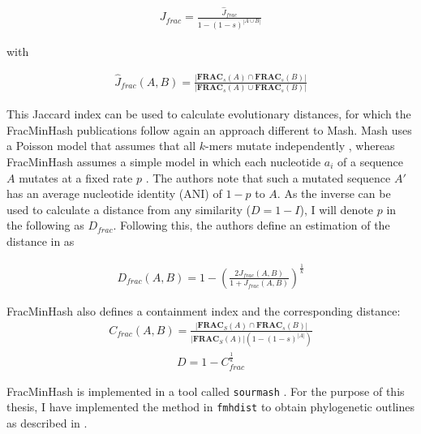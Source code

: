 \begin{align}
  J_{frac} = \frac{\hat{J}_{frac}}{1 - (1 - s)^{|A \cup B|}}
\end{align}

with

\begin{align}
  \hat{J}_{frac}(A, B) = \frac{|\mathbf{FRAC}_s(A) \cap \mathbf{FRAC}_s(B)|}{|\mathbf{FRAC}_s(A) \cup \mathbf{FRAC}_s(B)|}  
\end{align}

This Jaccard index can be used to calculate evolutionary distances, for which
the FracMinHash publications follow again an approach different to Mash. Mash
uses a Poisson model that assumes that all $k$-mers mutate independently
\cite{ondovMashFastGenome2016,heraDerivingConfidenceIntervals2023,fanAssemblyAlignmentfreeMethod2015},
whereas FracMinHash assumes a simple model in which each nucleotide $a_i$ of a
sequence $A$ mutates at a fixed rate $p$
\cite{heraDerivingConfidenceIntervals2023}. The authors note that such a
mutated sequence $A'$ has an average nucleotide identity (ANI) of $1-p$ to $A$.
As the inverse can be used to calculate a distance from any similarity ($D = 1 -
I$), I will denote $p$ in the following as $D_{frac}$. Following this, the
authors define an estimation of the distance in
\cite{heraDerivingConfidenceIntervals2023} as

\begin{align}
  D_{frac}(A, B) = 1 - (\frac{2J_{frac}(A,B)}{1+J_{frac}(A, B)})^{\frac{1}{k}}
\end{align}

FracMinHash also defines a containment index and the corresponding distance:
\begin{align}
  C_{frac}(A, B) = \frac{|\mathbf{FRAC}_S(A) \cap \mathbf{FRAC}_s(B)|}{|\mathbf{FRAC}_S(A)| (1-(1-s)^{|A|})}
\end{align}
\begin{align}
  D=1-C_{frac}^{\frac{1}{k}}
\end{align}

FracMinHash is implemented in a tool called \texttt{sourmash}
\cite{irberLightweightCompositionalAnalysis2022,irberDecentralizingIndicesGenomic2020}.
For the purpose of this thesis, I have implemented the method in
\texttt{fmhdist} to obtain phylogenetic outlines as described in
\cite{bagciMicrobialPhylogeneticContext2021}.

